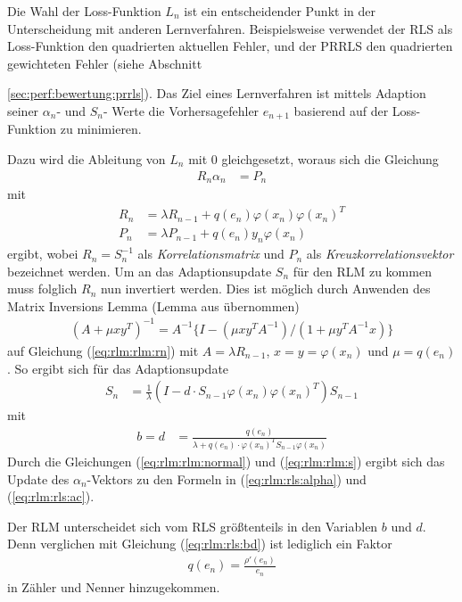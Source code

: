 \documentclass[a4paper, 12pt]{article}
\begin{document}
Die Wahl der Loss-Funktion $L_n$ ist ein entscheidender Punkt in der Unterscheidung mit anderen Lernverfahren. Beispielsweise verwendet der RLS als Loss-Funktion den quadrierten aktuellen Fehler, und der PRRLS den quadrierten gewichteten Fehler (siehe Abschnitt {\ref{sec:perf:bewertung:prrls}).
Das Ziel eines Lernverfahren ist mittels Adaption seiner $\alpha_n$- und $S_n$- Werte die Vorhersagefehler $e_{n+1}$ basierend auf der Loss-Funktion zu minimieren.

Dazu wird die Ableitung von $L_n$ mit $0$ gleichgesetzt, woraus sich die Gleichung
\begin{align}
    \label{eq:rlm:rlm:normal}
    R_n \alpha_n &= P_n
\end{align}
mit
\begin{align}
    \label{eq:rlm:rlm:rn}
    R_n &= \lambda R_{n-1} + q(e_n)\varphi(x_n)\varphi(x_n)^T \\
    P_n &= \lambda P_{n-1} + q(e_n)y_n\varphi(x_n) \nonumber
\end{align}
ergibt, wobei $R_n = S^{-1}_n$ als \emph{Korrelationsmatrix} und $P_n$ als \emph{Kreuzkorrelationsvektor} bezeichnet werden. Um an das Adaptionsupdate $S_n$ für den RLM zu kommen muss folglich $R_n$ nun invertiert werden. Dies ist möglich durch Anwenden des Matrix Inversions Lemma (Lemma aus \cite{zou2000recursive} übernommen)
\begin{align*}
    (A + \mu xy^T)^{-1} = A^{-1}\{I-(\mu x y^T A^{-1}) / (1+ \mu y^T A^{-1}x)\}
\end{align*}
auf Gleichung (\ref{eq:rlm:rlm:rn}) mit $A = \lambda R_{n-1}$, $x=y=\varphi(x_n)$ und $\mu = q(e_n)$. So ergibt sich für das Adaptionsupdate
\begin{align}
    \label{eq:rlm:rlm:s}
    S_n &= \frac{1}{\lambda}(I - d \cdot S_{n-1}\varphi(x_n)\varphi(x_n)^T)S_{n-1}
\end{align}
mit
\begin{align}
    \label{eq:rlm:rlm:bd}
    b = d &= \frac{q(e_n)}{\lambda+ q(e_n) \cdot\varphi(x_n)^T S_{n-1} \varphi(x_n)}
\end{align}
Durch die Gleichungen (\ref{eq:rlm:rlm:normal}) und (\ref{eq:rlm:rlm:s}) ergibt sich das Update des $\alpha_n$-Vektors zu den Formeln in (\ref{eq:rlm:rls:alpha}) und (\ref{eq:rlm:rls:ac}).

\vspace{5mm}
Der RLM unterscheidet sich vom RLS größtenteils in den Variablen $b$ und $d$. Denn verglichen mit Gleichung (\ref{eq:rlm:rls:bd}) ist lediglich ein Faktor 
\begin{align*}
    q(e_n) = \frac{\rho'(e_n)}{e_n}
\end{align*}
in Zähler und Nenner hinzugekommen.

}
\end{document}
